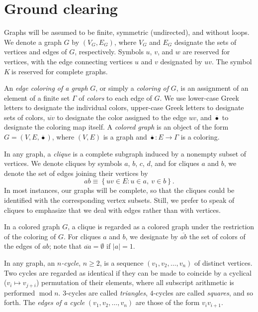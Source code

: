 \documentclass[12pt]{amsart}
\theoremstyle{plain}
\numberwithin{equation}{section}
\begin{document}
\section{Ground clearing}

Graphs will be assumed to be finite, symmetric (undirected), and without loops.
We denote a graph $G$ by $\left(  V_{G},E_{G}\right)  $, where $V_{G}$ and
$E_{G}$ designate the sets of vertices and edges of $G$, respectively. Symbols
$u$, $v$, and $w$ are reserved for vertices, with the edge connecting vertices
$u$ and $v$ designated by $uv$. The symbol $K\ $is reserved for complete
graphs.

An \emph{edge coloring of a graph }$G$, or simply a \emph{coloring of }$G$, is
an assignment of an element of a finite set $\Gamma$ of \emph{colors} to each
edge of $G$. We use lower-case Greek letters to designate the individual
colors, upper-case Greek letters to designate sets of colors, $\overline{uv}$
to designate the color assigned to the edge $uv$, and $\overline{\bullet}$ to
designate the coloring map itself. A \emph{colored graph} is an object of the
form $G=\left(  V,E,\overline{\bullet}\right)  $, where $\left(  V,E\right)  $
is a graph and $\overline{\bullet}:E\rightarrow \Gamma$ is a coloring.

In any graph, a \emph{clique} is a complete subgraph induced by a nonempty
subset of vertices. We denote cliques by symbols $a$, $b$, $c$, $d$, and for
cliques $a$ and $b$, we denote the set of edges joining their vertices by
\[
ab\equiv\left\{  uv\in E:u\in a,\ v\in b\right\}  .
\]
In most instances, our graphs will be complete, so that the cliques could be
identified with the corresponding vertex subsets. Still, we prefer to speak of
cliques to emphasize that we deal with edges rather than with vertices.

In a colored graph $G$, a clique is regarded as a colored graph under the
restriction of the coloring of $G$. For cliques $a$ and $b$, we designate by
$\overline{ab}$ the set of colors of the edges of $ab$; note that
$\overline{aa}=\emptyset$ if $\left\vert a\right\vert =1$.

In any graph, an $n$\emph{-cycle}, $n\geq2$, is a sequence $\left(
v_{1},v_{2},\ldots,v_{n}\right)  $ of distinct vertices. Two cycles are
regarded as identical if they can be made to coincide by a cyclical
($v_{i}\longmapsto v_{j+i}$) permutation of their elements, where all
subscript arithmetic is performed $\operatorname{mod}n$. $3$-cycles are called
\emph{triangles}, $4$-cycles are called \emph{squares}, and so forth. The
\emph{edges of a cycle }$\left(  v_{1},v_{2},\ldots,v_{n}\right)  $ are those
of the form $v_{i}v_{i+1}$.
\end{document}
